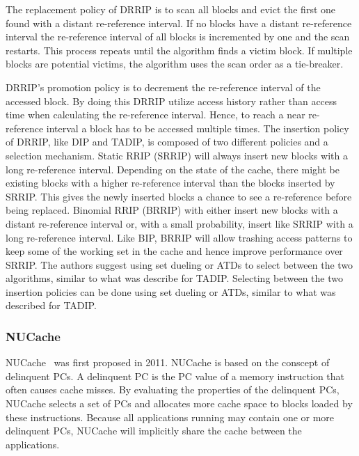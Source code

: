 The replacement policy of DRRIP is to scan all blocks and evict the first one found with a distant re-reference interval.
If no blocks have a distant re-reference interval the re-reference interval of all blocks is incremented by one and the scan restarts.
This process repeats until the algorithm finds a victim block.
If multiple blocks are potential victims, the algorithm uses the scan order as a tie-breaker.

DRRIP's promotion policy is to decrement the re-reference interval of the accessed block.
By doing this DRRIP utilize access history rather than access time when calculating the re-reference interval.
Hence, to reach a near re-reference interval a block has to be accessed multiple times.
The insertion policy of DRRIP, like DIP and TADIP, is composed of two different policies and a selection mechanism.
Static RRIP (SRRIP) will always insert new blocks with a long re-reference interval. 
Depending on the state of the cache, there might be existing blocks with a higher re-reference interval than the blocks inserted by SRRIP.
This gives the newly inserted blocks a chance to see a re-reference before being replaced.
Binomial RRIP (BRRIP) with either insert new blocks with a distant re-reference interval or, with a small probability, insert like SRRIP with a long re-reference interval.
Like BIP, BRRIP will allow trashing access patterns to keep some of the working set in the cache and hence improve performance over SRRIP.
The authors suggest using set dueling or ATDs to select between the two algorithms, similar to what was describe for TADIP.
Selecting between the two insertion policies can be done using set dueling or ATDs, similar to what was described for TADIP.

\subsubsection{NUCache}

NUCache~\cite{Manikantan2011} was first proposed in 2011.
NUCache is based on the conscept of delinquent PCs.
A delinquent PC is the PC value of a memory instruction that often causes cache misses.
By evaluating the properties of the delinquent PCs, NUCache selects a set of PCs and allocates more cache space to blocks loaded by these instructions.
Because all applications running may contain one or more delinquent PCs, NUCache will implicitly share the cache between the applications.



